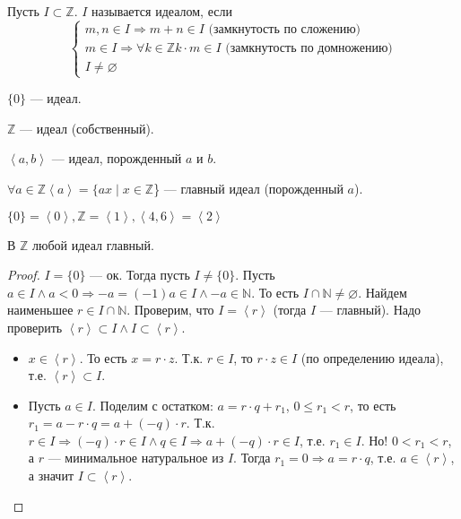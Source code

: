 \begin{definition}
    Пусть $I \subset \mathbb{Z}$.  $I$ называется идеалом, если  \[\left\{ \begin{array}{l} m, n \in I \Rightarrow m+n \in I \text{ (замкнутость по сложению)} \\ m \in I \Rightarrow \forall k \in \mathbb{Z} k \cdot m \in I \text{ (замкнутость по домножению)} \\ I \neq \varnothing \end{array} \right.\]
\end{definition}
\begin{example}
    $\{0\}$ --- идеал.
\end{example}
\begin{example}
    $\mathbb{Z}$ --- идеал (собственный).
\end{example}
\begin{example}
    $\left<a,b\right>$ --- идеал, порожденный $a$ и $b$.
\end{example}
    $\forall a \in \mathbb{Z} \left<a\right> = \{ ax \; \vert \; x \in \mathbb{Z}$\} --- главный идеал (порожденный $a$).
\begin{example}
    $\{0\} = \left<0\right>, \mathbb{Z} = \left<1\right>, \left<4, 6\right> = \left<2\right>$
\end{example}
\begin{theorem}
   В $\mathbb{Z}$ любой идеал главный.
\end{theorem}
\begin{proof}
    $I=\{0\}$ --- ок. Тогда  пусть $I \neq \{0\}$. Пусть $a \in I \land a < 0 \Rightarrow -a = (-1)a \in I \land -a \in \mathbb{N}$. То есть $I \cap \mathbb{N} \neq \varnothing$. Найдем наименьшее $r \in I \cap \mathbb{N}$. Проверим, что $I = \left<r\right>$ (тогда $I$ --- главный). Надо проверить $\left<r\right> \subset I \land I \subset \left< r \right>$.
     \begin{itemize}
         \item $x \in \left<r\right>$. То есть $x = r \cdot z$. Т.к.  $r \in I$, то $r \cdot z \in I$ (по определению идеала), т.е.  $\left<r\right> \subset I$.
         \item  Пусть $a \in I$. Поделим с остатком: $a = r \cdot q + r_1$, $0 \le r_1 < r$, то есть $r_1 = a - r \cdot q = a + (-q) \cdot r$. Т.к. $r \in I \Rightarrow (-q) \cdot r \in I \land q \in I \Rightarrow a + (-q) \cdot r \in I$, т.е. $r_1 \in I$. Но! $0 < r_1 < r$, а $r$ --- минимальное натуральное из  $I$. Тогда  $r_1 = 0 \Rightarrow a = r \cdot q$, т.е. $a \in \left<r\right>$, а значит  $I \subset \left<r\right>$.
    \end{itemize}
\end{proof}

